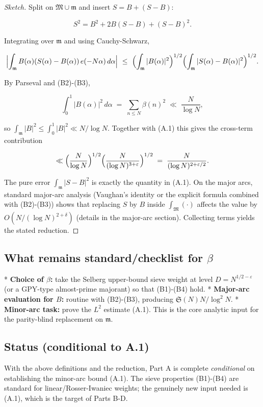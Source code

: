 \documentclass[11pt]{article}
\theoremstyle{definition}
\theoremstyle{remark}
\begin{document}
\begin{proof}[Sketch]
	Split on $\mathfrak M\cup\mathfrak m$ and insert $S=B+(S-B)$:

	$$
		S^2 = B^2 + 2B(S-B) + (S-B)^2.
	$$

	Integrating over $\mathfrak m$ and using Cauchy-Schwarz,

	$$
		\Bigl|\int_{\mathfrak m} B(\alpha)(S(\alpha)-B(\alpha))\,e(-N\alpha)\,d\alpha\Bigr|
		\ \le\ \Bigl(\int_{\mathfrak m}|B(\alpha)|^2\Bigr)^{1/2}
		\Bigl(\int_{\mathfrak m}|S(\alpha)-B(\alpha)|^2\Bigr)^{1/2}.
	$$

	By Parseval and (B2)-(B3),

	$$
		\int_0^1 |B(\alpha)|^2\,d\alpha \;=\; \sum_{n\le N}\beta(n)^2 \;\ll\; \frac{N}{\log N},
	$$

	so $\int_{\mathfrak m}|B|^2\le\int_0^1|B|^2\ll N/\log N$. Together with (A.1) this gives the cross-term contribution

	$$
		\ll \Bigl(\frac{N}{\log N}\Bigr)^{1/2}\Bigl(\frac{N}{(\log N)^{3+\varepsilon}}\Bigr)^{1/2}
		\;=\;\frac{N}{(\log N)^{2+\varepsilon/2}}.
	$$

	The pure error $\int_{\mathfrak m}|S-B|^2$ is exactly the quantity in (A.1). On the major arcs, standard major-arc analysis (Vaughan’s identity or the explicit formula combined with (B2)-(B3)) shows that replacing $S$ by $B$ inside $\int_{\mathfrak M}(\cdot)$ affects the value by $O(N/(\log N)^{2+\delta})$ (details in the major-arc section). Collecting terms yields the stated reduction.
\end{proof}

\subsection*{What remains standard/checklist for $\beta$}

* \textbf{Choice of $\beta$:} take the Selberg upper-bound sieve weight at level $D=N^{1/2-\varepsilon}$ (or a GPY-type almost-prime majorant) so that (B1)-(B4) hold.
* \textbf{Major-arc evaluation for $B$:} routine with (B2)-(B3), producing $\mathfrak S(N)N/\log^2 N$.
* \textbf{Minor-arc task:} prove the $L^2$ estimate (A.1). This is the core analytic input for the parity-blind replacement on $\mathfrak m$.


\subsection*{Status (conditional to A.1)}
With the above definitions and the reduction, Part A is complete \emph{conditional} on establishing the minor-arc bound (A.1). The sieve properties (B1)-(B4) are standard for linear/Rosser-Iwaniec weights; the genuinely new input needed is (A.1), which is the target of Parts B-D.
\end{document}
